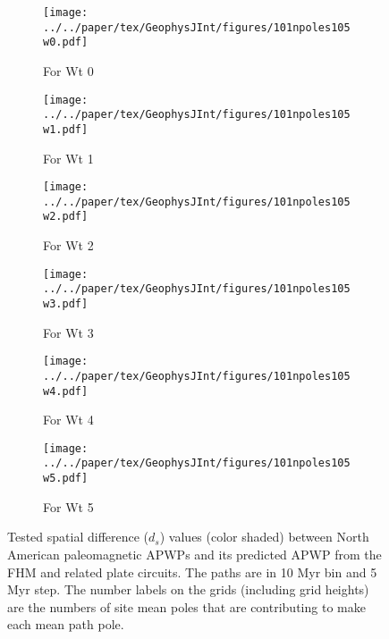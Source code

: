 \begin{figure}[!ht]
	\centering
	\begin{subfigure}{.495\textwidth}
		\texttt{[image: ../../paper/tex/GeophysJInt/figures/101npoles105w0.pdf]}
		\caption{For Wt 0}\label{fig-na-dsw0}
	\end{subfigure}
	\vspace{.1em}
	\begin{subfigure}{.495\textwidth}
		\texttt{[image: ../../paper/tex/GeophysJInt/figures/101npoles105w1.pdf]}
		\caption{For Wt 1}\label{fig-na-dsw1}
	\end{subfigure}
	\vspace{.1em}
	\begin{subfigure}{.495\textwidth}
		\texttt{[image: ../../paper/tex/GeophysJInt/figures/101npoles105w2.pdf]}
		\caption{For Wt 2}\label{fig-na-dsw2}
	\end{subfigure}
	\vspace{.1em}
	\begin{subfigure}{.495\textwidth}
		\texttt{[image: ../../paper/tex/GeophysJInt/figures/101npoles105w3.pdf]}
		\caption{For Wt 3}\label{fig-na-dsw3}
	\end{subfigure}
	\vspace{.1em}
	\begin{subfigure}{.495\textwidth}
		\texttt{[image: ../../paper/tex/GeophysJInt/figures/101npoles105w4.pdf]}
		\caption{For Wt 4}\label{fig-na-dsw4}
	\end{subfigure}
	\vspace{.1em}
	\begin{subfigure}{.495\textwidth}
		\texttt{[image: ../../paper/tex/GeophysJInt/figures/101npoles105w5.pdf]}
		\caption{For Wt 5}\label{fig-na-dsw5}
	\end{subfigure}
	\caption[$d_s$ of each pair of poles for North American 10/5 Myr APWPs]{Tested
spatial difference ($d_s$) values (color shaded) between North American
paleomagnetic APWPs and its predicted APWP from the FHM and related plate
circuits. The paths are in 10 Myr bin and 5 Myr step. The number labels on the
grids (including grid heights) are the numbers of site mean poles that are
contributing to make each mean path pole.}\label{fig-nads}
\end{figure}

